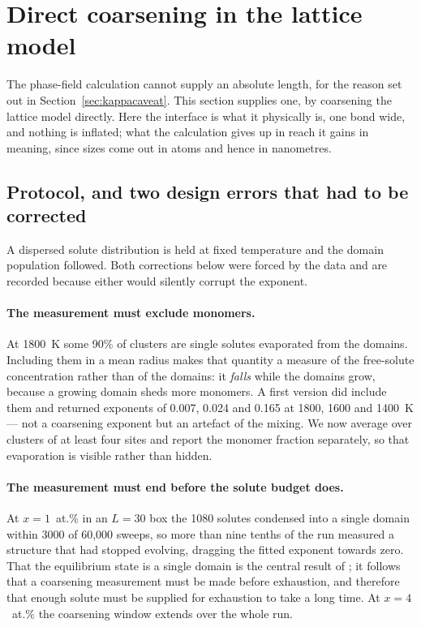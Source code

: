 \documentclass[11pt,a4paper]{article}
\begin{document}
\section{Direct coarsening in the lattice model}
\label{sec:latticecoarsen}

The phase-field calculation cannot supply an absolute length, for the reason set
out in Section~\ref{sec:kappacaveat}. This section supplies one, by coarsening
the lattice model directly. Here the interface is what it physically is, one
bond wide, and nothing is inflated; what the calculation gives up in reach it
gains in meaning, since sizes come out in atoms and hence in nanometres.

\subsection{Protocol, and two design errors that had to be corrected}

A dispersed solute distribution is held at fixed temperature and the domain
population followed. Both corrections below were forced by the data and are
recorded because either would silently corrupt the exponent.

\paragraph{The measurement must exclude monomers.} At 1800~K some 90\% of
clusters are single solutes evaporated from the domains. Including them in a
mean radius makes that quantity a measure of the free-solute concentration
rather than of the domains: it \emph{falls} while the domains grow, because a
growing domain sheds more monomers. A first version did include them and
returned exponents of 0.007, 0.024 and 0.165 at 1800, 1600 and 1400~K --- not a
coarsening exponent but an artefact of the mixing. We now average over clusters
of at least four sites and report the monomer fraction separately, so that
evaporation is visible rather than hidden.

\paragraph{The measurement must end before the solute budget does.} At
$x = 1$~at.\% in an $L = 30$ box the 1080 solutes condensed into a single domain
within 3000 of 60{,}000 sweeps, so more than nine tenths of the run measured a
structure that had stopped evolving, dragging the fitted exponent towards zero.
That the equilibrium state is a single domain is the central result of
\citet{yu2026b}; it follows that a coarsening measurement must be made before
exhaustion, and therefore that enough solute must be supplied for exhaustion to
take a long time. At $x = 4$~at.\% the coarsening window extends over the whole
run.
\end{document}
